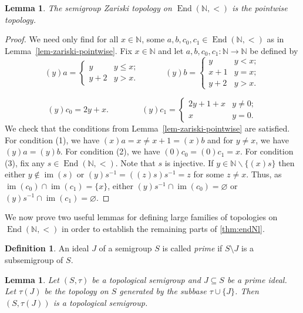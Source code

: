 \documentclass[11pt]{amsart}
\newtheorem{lemma}[theorem]{Lemma}
\theoremstyle{definition}
\newtheorem{definition}[theorem]{Definition}
\newcommand{\N}{\mathbb N}
\newcommand{\im}{\operatorname{im}}
\begin{document}
\begin{lemma}\label{lem:zariski_pointwise}
    The semigroup Zariski topology on \(\operatorname{End}(\N, <)\) is the pointwise topology.
\end{lemma}
\begin{proof}
    We need only find for all \(x\in \N\), some \(a, b, c_0, c_1\in \operatorname{End}(\N, <)\) as in Lemma~\ref{lem-zariski-pointwise}. Fix $x\in \N$ and let \(a, b, c_0,c_1:\N\to \N\) be defined by
     \[(y)a=\begin{cases}
         y & y\leq x;\\
         y+2 & y>x.
     \end{cases}\quad\quad\quad(y)b=\begin{cases}
         y & y< x;\\
         x+1 & y=x;\\
         y+2 & y>x.
     \end{cases}\]

     \[(y)c_0=2y+x.\quad\quad\quad\quad(y)c_1=\begin{cases}
            2y+1+x & y\neq 0;\\
            x & y=0.
        \end{cases}\]
We check that the conditions from Lemma~\ref{lem-zariski-pointwise} are satisfied. For condition (1), we have \((x)a=x\neq x+1=(x)b\) and for \(y\neq x\), we have \((y)a=(y)b\).
For condition (2), we have \((0)c_0=(0)c_1=x\).
For condition (3), fix any \(s\in \operatorname{End}(\N,<)\). Note that \(s\) is injective. If \(y\in \N\backslash \{(x)s\}\) then either \(y\notin \im(s)\) or \((y)s^{-1}=((z)s)s^{-1}=z \) for some \(z\neq x\). Thus, as \(\im(c_0)\cap\im(c_1)=\{x\}\), either \((y)s^{-1}\cap\im(c_0)=\varnothing\) or \((y)s^{-1}\cap \im(c_1)=\varnothing\).     
\end{proof}

We now prove two useful lemmas for defining large families of topologies on $\operatorname{End}(\N, <)$ in order to establish the remaining parts of \cref{thm:endNl}.

\begin{definition}
    An ideal $J$ of a semigroup $S$ is called {\em prime} if $S\setminus J$ is a subsemigroup of \(S\). 
\end{definition}



\begin{lemma}\label{sem}
Let $(S,\tau)$ be a topological semigroup and $J\subseteq S$ be a prime ideal.  Let $\tau(J)$ be the topology on $S$ generated by the subbase $\tau\cup\{J\}$. Then $(S,\tau(J))$ is a topological semigroup.   
\end{lemma}
\end{document}
